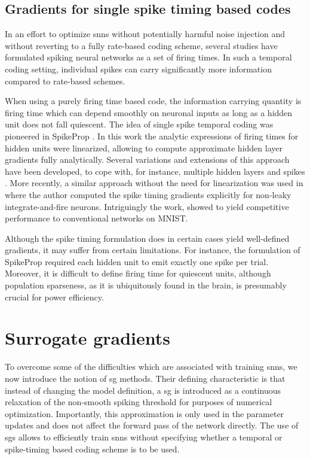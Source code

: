 \documentclass[journal,onecolumn,11pt]{IEEEtran}
\begin{document}
\subsection{Gradients for single spike timing based codes}

In an effort to optimize \glspl{snn} without potentially harmful noise
injection and without reverting to a fully rate-based coding scheme, 
several studies have formulated spiking neural
networks as a set of firing times.
In such a temporal coding setting, individual spikes can carry significantly more
information compared to rate-based schemes.

When using a purely firing time based code, the information carrying quantity is
firing time which can depend smoothly on neuronal inputs as long as a hidden
unit does not fall quiescent.
The idea of single spike temporal coding was 
pioneered in SpikeProp \cite{bohte_error-backpropagation_2002}.
In this work the analytic expressions of firing times for hidden units 
were linearized, allowing to compute approximate hidden layer gradients fully
analytically. 
Several variations and extensions of this approach have been developed,
to cope with, for instance, multiple hidden layers and spikes
\cite{banerjee_learning_2016}. %
More recently, a similar approach without the need for linearization 
was used in \cite{Mostafa16_supelear} where the author computed the spike timing 
gradients explicitly for non-leaky integrate-and-fire neurons. 
Intriguingly the work, showed to yield competitive performance to conventional
networks on MNIST.

Although the spike timing formulation does in certain cases
yield well-defined gradients, it may suffer from certain
limitations. 
For instance, the formulation of SpikeProp required each hidden
unit to emit exactly one spike per trial. Moreover, it is difficult to define 
firing time for quiescent units, although population sparseness, as it is
ubiquitously found in the brain, is presumably crucial for power
efficiency.


\section{Surrogate gradients}
\label{sec:surrogate_gradients}

To overcome some of the difficulties which are associated with training \glspl{snn}, we now introduce the notion of \gls{sg} methods.
Their defining characteristic is that instead of changing the model definition, a \gls{sg} is introduced as a continuous relaxation of the non-smooth spiking threshold for purposes of numerical optimization.
Importantly, this approximation is only used in the parameter updates and does not affect the forward pass of the network directly.
The use of \glspl{sg} allows to efficiently train \glspl{snn} without specifying whether a temporal or spike-timing based coding scheme is to be used. 
\end{document}
